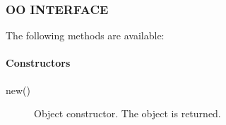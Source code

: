 \subsubsection*{OO INTERFACE\label{ORAC::Print_OO_INTERFACE}}


The following methods are available:

\paragraph*{Constructors\label{ORAC::Print_Constructors}}
\begin{description}

\item[new()] \mbox{}

Object constructor. The object is returned.

\end{description}
